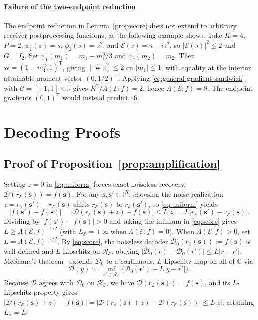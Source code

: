 \documentclass[journal,12pt,onecolumn,draftclsnofoot]{IEEEtran}
\newcommand{\enc}{\mathscr{E}}\newcommand{\dec}{\mathscr{D}}\newcommand{\R}{\mathbb R}\newcommand{\C}{\mathbb C}
\newcommand{\T}{\mathsf T}\newcommand{\suc}{\succeq}
\begin{document}
\paragraph{Failure of the two-endpoint reduction}

The endpoint reduction in Lemma~\ref{prop:score} does not
extend to arbitrary receiver postprocessing functions,
as the following example shows. Take $K=4$, $P=2$, $\phi_1(s)=s$, $\phi_2(s)=s^2$, and
$\enc(s)=s+is^2$, so $|\enc(s)|^2\le2$ and $G=I_2$.
Set $\psi_1(m_1)=m_1-m_1^3/3$ and $\psi_2(m_2)=m_2$.
Then $\boldsymbol w=(1-m_1^2,1)^\T$, giving
$\|\boldsymbol w\|_2^2\le2$ on $|m_1|\le1$, with equality at
the interior attainable moment vector $(0,1/2)^\T$. Applying \eqref{eq:general-gradient-sandwich} with
$\mathcal C=[-1,1]\times\R$ gives
$K^2/\Lambda(\enc;f)=2$, hence $\Lambda(\enc;f)=8$. The endpoint gradients $(0,1)^\T$ would instead predict $16$.




\section{Decoding Proofs}\label{app:decoding-proofs}
\subsection{Proof of Proposition~\ref{prop:amplification}}\label{app:amplification-proof}


Setting $z=0$ in \eqref{eq:uniform} forces exact noiseless recovery, $\dec(r_\enc(\boldsymbol s))=f(\boldsymbol s)$.
For any $\boldsymbol s,\boldsymbol s'\in\mathbb I^K$, choosing the noise realization $z=r_\enc(\boldsymbol s')-r_\enc(\boldsymbol s)$ shifts $r_\enc(\boldsymbol s)$ to $r_\enc(\boldsymbol s')$, so \eqref{eq:uniform} yields
$$
|f(\boldsymbol s')-f(\boldsymbol s)|
=|\dec(r_\enc(\boldsymbol s)+z)-f(\boldsymbol s)|
\le L|z|=L|r_\enc(\boldsymbol s')-r_\enc(\boldsymbol s)|.
$$
Dividing by $|f(\boldsymbol s')-f(\boldsymbol s)|>0$ and taking the infimum in \eqref{eq:score} gives $L\ge\Lambda(\enc;f)^{-1/2}$ (with $L_\enc=+\infty$ when $\Lambda(\enc;f)=0$). When $\Lambda(\enc;f)>0$, set $L=\Lambda(\enc;f)^{-1/2}$. By \eqref{eq:score}, the noiseless decoder $\dec_0(r_\enc(\boldsymbol s)):=f(\boldsymbol s)$ is well defined and $L$-Lipschitz on $\mathcal R_\enc$, obeying $|\dec_0(r)-\dec_0(r')|\le L|r-r'|$.
McShane's theorem~\cite{mcshane1934} extends $\dec_0$ to a continuous, $L$-Lipschitz map on all of $\C$ via
$$
\dec(y):=\inf_{r'\in\mathcal R_\enc}
\{\dec_0(r')+L|y-r'|\}.
$$
Because $\dec$ agrees with $\dec_0$ on $\mathcal R_\enc$, we have $\dec(r_\enc(\boldsymbol s))=f(\boldsymbol s)$, and its $L$-Lipschitz property gives
$|\dec(r_\enc(\boldsymbol s)+z)-f(\boldsymbol s)|=|\dec(r_\enc(\boldsymbol s)+z)-\dec(r_\enc(\boldsymbol s))|\le L|z|$, attaining $L_\enc=L$.
\end{document}
